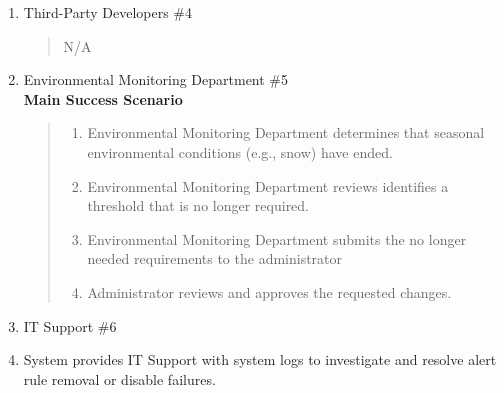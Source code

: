 \documentclass[]{article}
\begin{document}
\begin{enumerate}[{\bf BE3.}]
\begin{enumerate}[{\bf VP1.}]
			\item Third-Party Developers \#4
				\begin{quote}
				    N/A
				\end{quote}
                
			\item Environmental Monitoring Department \#5 \\
                \textbf{Main Success Scenario} 
                \begin{quote}
                \begin{enumerate}[1.]
                    \item Environmental Monitoring Department determines that seasonal environmental conditions (e.g., snow) have ended.
                    \item Environmental Monitoring Department reviews identifies a threshold that is no longer required.
                    \item Environmental Monitoring Department submits the no longer needed requirements to the administrator
                    \item Administrator reviews and approves the requested changes.
                \end{enumerate}
                \end{quote}

			\item IT Support \#6
                \item[\textmd{7i}] System provides IT Support with system logs to investigate and resolve alert rule removal or disable failures.
		\end{enumerate}
        

\end{enumerate}
\end{document}
